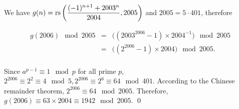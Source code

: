 
\begin{pf} \rm
We have $\displaystyle g(n) = \mathrm{rs} \left( \frac{(-1)^{n+1} + 2003^n}{2004} , 2005 \right)$
and $2005=5\cdot 401$, therefore
 
\[
 \begin{array}{rcl}
   g(2006) \mod 2005 & = & \Big((2003^{2006} - 1) \times 2004^{-1} \Big) \mod 2005 \\
                     & = & \Big((2^{2006} - 1) \times 2004\Big) \mod 2005. \\
 \end{array}
\]

Since $a^{p-1} \equiv 1\mod p$ for all prime $p$,
$2^{2006} \equiv 2^2 \equiv 4\mod 5, 2^{2006} \equiv 2^6 \equiv 64 \mod 401$.
According to the Chinese remainder theorem,
$2^{2006} \equiv 64\mod 2005$. Therefore, $g(2006) \equiv 63\times2004
\equiv 1942\mod 2005$. \qed

\end{pf}
